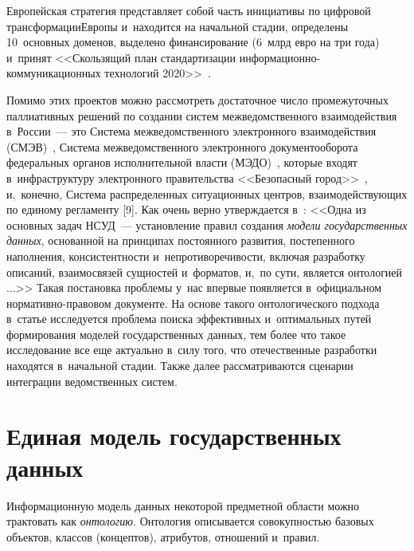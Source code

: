 \begin{multicols}{2}
Европейская стратегия представляет собой часть инициативы по цифровой 
трансформации\linebreak Европы и~находится на начальной стадии, определены 
10~основных доменов, выделено финансирование (6~млрд евро на три 
года) и~принят <<\mbox{Скользящий} план стандартизации 
ин\-фор\-ма\-ци\-он\-но-ком\-му\-ни\-ка\-ци\-он\-ных технологий 
2020>>~\cite{5-suc}.

Помимо этих проектов можно рассмотреть достаточное чис\-ло 
промежуточных паллиативных решений по создании сис\-тем 
межведомственного взаимодействия в~России~--- это Сис\-те\-ма 
межведомственного электронного взаимодействия (\mbox{СМЭВ})~\cite{6-suc}, 
Сис\-те\-ма межведомственного электронного документооборота федеральных 
органов исполнительной влас\-ти (МЭДО)~\cite{7-suc}, которые входят 
в~инфраструктуру электронного правительства <<Безопасный 
город>>~\cite{8-suc}, и,~конечно, Сис\-те\-ма распределенных ситуационных 
цент\-ров, \mbox{вза\-и\-мо\-дей\-ст\-ву\-ющих} по единому регламенту [9].
Как очень вер\-но утверж\-да\-ет\-ся в~\cite{2-suc}: <<Одна из основных задач 
НСУД~--- установление правил создания \textit{модели государственных 
данных}, основанной на принципах по\-сто\-ян\-но\-го развития, постепенного 
наполнения, кон\-сис\-тент\-ности и~не\-про\-ти\-во\-ре\-чи\-вости, включая разработку 
описаний, взаимосвязей сущностей и~форматов, и,~по сути, является 
онтологией$\ldots$>> Такая постановка проб\-ле\-мы у~нас впервые 
появляется в~официальном нор\-ма\-тив\-но-пра\-во\-вом документе. На основе такого 
онтологического подхода в~\mbox{статье} исследуется проб\-ле\-ма поиска 
эффективных и~оптимальных путей формирования моделей 
государственных данных, тем более что такое исследование все еще 
актуально в~силу того, что отечественные разработки находятся в~начальной 
стадии. Так\-же далее рассматриваются сценарии интеграции ведомственных 
сис\-тем.

\vspace*{-6pt}

\section{Единая модель государственных данных} %

\vspace*{-4pt}

Информационную модель данных некоторой предметной об\-ласти можно 
трактовать как \textit{онтологию}. Онтология описывается со\-во\-куп\-ностью 
базовых объектов, классов (концептов), атрибутов, отношений и~правил.


\end{multicols}
